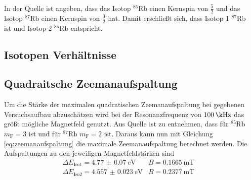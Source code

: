 In der Quelle \cite{pdf_anleitung} ist angeben, dass das Isotop {$^{85}\text{Rb}$ einen Kernspin von $\frac{5}{2}$} und das Isotop $^{87}\text{Rb}$ einen Kernspin von $\frac{3}{2}$ hat.
Damit erschließt sich, dass Isotop 1  $^{87}\text{Rb}$ ist und Isotop 2 $^{85}\text{Rb}$ entspricht.

\subsection{Isotopen Verhältnisse}
\subsection{Quadraitsche Zeemanaufspaltung}
Um die Stärke der maximalen quadratischen Zeemanaufspaltung bei gegebenen Versuchsaufbau abzuschätzen wird bei der Resonanzfrequenz von $\SI{100}{\k\Hz}$ das größt mögliche Magnetfeld genutzt.
Aus Quelle \cite{pdf_anleitung} ist zu entnehmen, dass für $^{85}\text{Rb}$ $m_\text{F} = 3$ ist und für $^{87}\text{Rb}$ $m_\text{F} = 2$ ist.
Daraus kann nun mit Gleichung \eqref{eq:zeemanaufspaltung} die maximale Zeemanaufspaltung berechnet werden.
Die Aufspaltungen zu den jeweiligen Magnetfeldstärken sind
\begin{align*}
    \Delta E_\text{Iso1} = \SI{4.77(7)}{\eV} & B=\SI{0.1665}{\m\tesla} \\
    \Delta E_\text{Iso2} = \SI{4.557(23)}{\eV} & B=\SI{0.2377}{\m\tesla} 
\end{align*}

